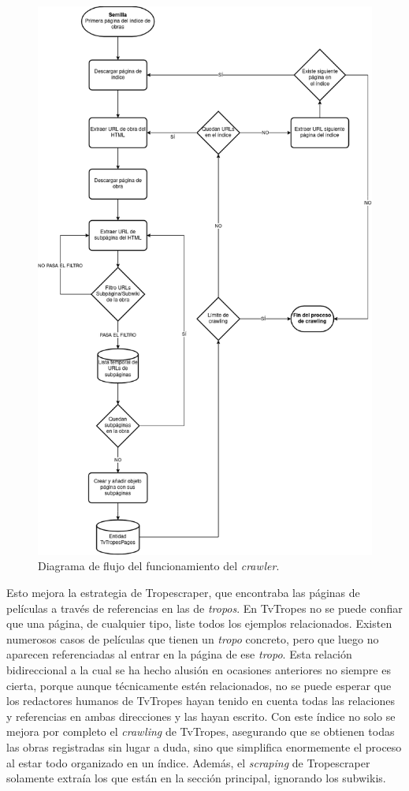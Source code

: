 \begin{figure}
    \includegraphics[width=\textwidth]{img/flujo_crawler.png}
    \caption{Diagrama de flujo del funcionamiento del \textit{crawler}.}
    \label{fig:crawling}
\end{figure}

Esto mejora la estrategia de Tropescraper, que encontraba las páginas de
películas a través de referencias en las de \textit{tropos}. En TvTropes no se
puede confiar que una página, de cualquier tipo, liste todos los ejemplos
relacionados. Existen numerosos casos de películas que tienen un \textit{tropo}
concreto, pero que luego no aparecen referenciadas al entrar en la página de ese
\textit{tropo}. Esta relación bidireccional a la cual se ha hecho alusión
en ocasiones anteriores no siempre es cierta, porque aunque técnicamente estén
relacionados, no se puede esperar que los redactores humanos de TvTropes hayan
tenido en cuenta todas las relaciones y referencias en ambas direcciones y las
hayan escrito. Con este índice no solo se mejora por completo el
\textit{crawling} de TvTropes, asegurando que se obtienen todas las obras
registradas sin lugar a duda, sino que simplifica enormemente el proceso al
estar todo organizado en un índice. Además, el \textit{scraping} de Tropescraper
solamente extraía los que están en la sección principal, ignorando los subwikis.

